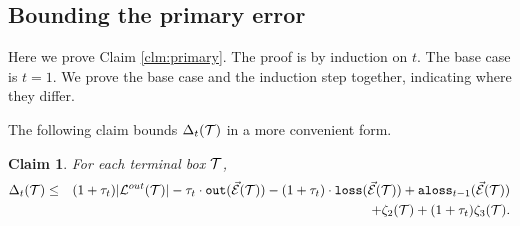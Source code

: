 \documentclass{acmsmall}
\newtheorem{claim}[theorem]{Claim}
\newcommand{\cB}{{\cal B}}
\newcommand{\cD}{{\cal D}}
\newcommand{\cE}{{\cal E}}
\newcommand{\cF}{{\cal F}}
\newcommand{\cL}{{\cal L}}
\newcommand{\cT}{{\cal T}}
\newcommand{\loss}{{\tt loss}}
\newcommand{\alis}{{\tt alis}}
\newcommand{\aloss}{{\tt aloss}}
\newcommand{\outside}{{\tt out}}
\newcommand{\kappaest}{\widehat{\kappa}}
\newcommand{\errorterm}{\zeta}
\begin{document}
\subsection{Bounding the primary error} \label{sec:primary}
Here we prove Claim \ref{clm:primary}.
The proof is by induction on $t$.  The base case is $t=1$.  We prove  the base case and the induction step together,
indicating where they differ.
%
%

The following claim  bounds $\Delta_t(\cT)$ in a more convenient form.

\begin{claim} \label{clm:delta}
For each terminal box $\cT$,
\begin{eqnarray*}
\Delta_t(\cT) & \leq & (1+\tau_t)|\cL^{out}(\cT)| - \tau_t \cdot \outside(\vec{\cE}(\cT))
- (1+\tau_t) \cdot \loss(\vec{\cE}(\cT)) + \aloss_{t-1}(\vec{\cE}(\cT)) \\
%
%
&&+\errorterm_2(\cT)+(1+\tau_t)\errorterm_3(\cT).
\end{eqnarray*}
\end{claim}

\end{document}
